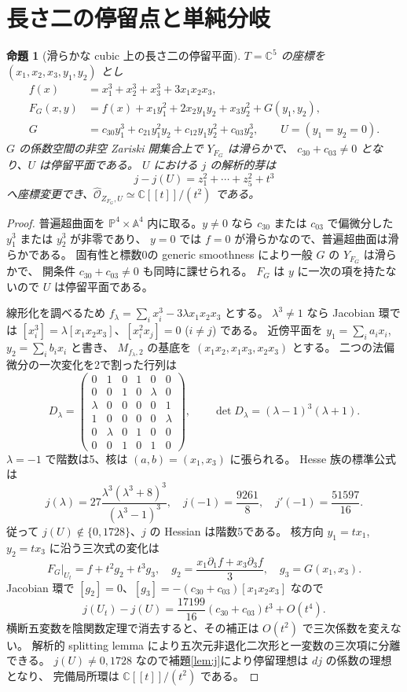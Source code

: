 \documentclass[11pt,a4paper]{ltjsarticle}
\newtheorem{proposition}[theorem]{命題}
\newcommand{\C}{\mathbb C}
\newcommand{\PP}{\mathbb P}
\newcommand{\OO}{\mathcal O}
\begin{document}
\section{長さ二の停留点と単純分岐}
\begin{proposition}[滑らかな cubic 上の長さ二の停留平面]\label{prop:length2}
$T=\C^5$ の座標を $(x_1,x_2,x_3,y_1,y_2)$ とし
\begin{align*}
 f(x)&=x_1^3+x_2^3+x_3^3+3x_1x_2x_3,\\
 F_G(x,y)&=f(x)+x_1y_1^2+2x_2y_1y_2+x_3y_2^2+G(y_1,y_2),\\
 G&=c_{30}y_1^3+c_{21}y_1^2y_2+c_{12}y_1y_2^2+c_{03}y_2^3,
 \qquad U=(y_1=y_2=0).
\end{align*}
$G$ の係数空間の非空 Zariski 開集合上で $Y_{F_G}$ は滑らかで、
$c_{30}+c_{03}\ne0$ となり、$U$ は停留平面である。
$U$ における $j$ の解析的芽は
\[
 j-j(U)=z_1^2+\cdots+z_5^2+t^3
\]
へ座標変更でき、$\widehat{\OO}_{Z_{F_G},U}\simeq\C[[t]]/(t^2)$ である。
\end{proposition}
\begin{proof}
普遍超曲面を $\PP^4\times\mathbb A^4$ 内に取る。$y\ne0$ なら
$c_{30}$ または $c_{03}$ で偏微分した $y_1^3$ または $y_2^3$ が非零であり、
$y=0$ では $f=0$ が滑らかなので、普遍超曲面は滑らかである。
固有性と標数0の generic smoothness により一般 $G$ の $Y_{F_G}$ は滑らかで、
開条件 $c_{30}+c_{03}\ne0$ も同時に課せられる。
$F_G$ は $y$ に一次の項を持たないので $U$ は停留平面である。

線形化を調べるため $f_\lambda=\sum_i x_i^3-3\lambda x_1x_2x_3$ とする。
$\lambda^3\ne1$ なら Jacobian 環では
$[x_i^3]=\lambda[x_1x_2x_3]$、$[x_i^2x_j]=0$ ($i\ne j$) である。
近傍平面を $y_1=\sum_ia_ix_i$, $y_2=\sum_ib_ix_i$ と書き、
$M_{f_\lambda,2}$ の基底を $(x_1x_2,x_1x_3,x_2x_3)$ とする。
二つの法偏微分の一次変化を2で割った行列は
\[
 D_\lambda=\begin{pmatrix}
 0&1&0&1&0&0\\
 0&0&1&0&\lambda&0\\
 \lambda&0&0&0&0&1\\
 1&0&0&0&0&\lambda\\
 0&\lambda&0&1&0&0\\
 0&0&1&0&1&0
\end{pmatrix},\qquad \det D_\lambda=(\lambda-1)^3(\lambda+1).
\]
$\lambda=-1$ で階数は5、核は $(a,b)=(x_1,x_3)$ に張られる。
Hesse 族の標準公式\cite[\S2]{Hesse}は
\[
 j(\lambda)=27\frac{\lambda^3(\lambda^3+8)^3}{(\lambda^3-1)^3},
\quad j(-1)=\frac{9261}{8},\quad j'(-1)=\frac{51597}{16}.
\]
従って $j(U)\not\in\{0,1728\}$、$j$ の Hessian は階数5である。
核方向 $y_1=tx_1$, $y_2=tx_3$ に沿う三次式の変化は
\[
 F_G|_{U_t}=f+t^2g_2+t^3g_3,\quad
 g_2=\frac{x_1\partial_1f+x_3\partial_3f}{3},\quad
 g_3=G(x_1,x_3).
\]
Jacobian 環で $[g_2]=0$、$[g_3]=-(c_{30}+c_{03})[x_1x_2x_3]$ なので
\[
 j(U_t)-j(U)=\frac{17199}{16}(c_{30}+c_{03})t^3+O(t^4).
\]
横断五変数を陰関数定理で消去すると、その補正は $O(t^2)$ で三次係数を変えない。
解析的 splitting lemma により五次元非退化二次形と一変数の三次項に分離できる。
$j(U)\ne0,1728$ なので補題\ref{lem:j}により停留理想は $dj$ の係数の理想となり、
完備局所環は $\C[[t]]/(t^2)$ である。
\end{proof}
\end{document}
